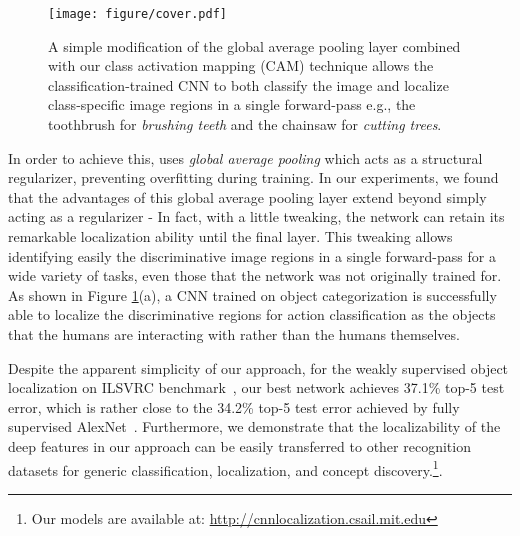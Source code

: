 \documentclass[10pt,twocolumn,letterpaper]{article}
\begin{document}
\begin{figure}
\begin{center}
\texttt{[image: figure/cover.pdf]}
\end{center}
\vspace*{-4mm}
\caption{A simple modification of the global average pooling layer combined with our class activation mapping (CAM) technique allows the classification-trained CNN to both classify the image and localize class-specific image regions in a single forward-pass e.g., the toothbrush for \textit{brushing teeth} and the chainsaw for \textit{cutting trees}.}\label{figure_cover}
\end{figure}

In order to achieve this, \cite{lin2013network} uses \textit{global average pooling} which acts as a structural regularizer, preventing overfitting during training. In our experiments, we found that the advantages of this global average pooling layer extend beyond simply acting as a regularizer - In fact, with a little tweaking, the network can retain its remarkable localization ability until the final layer. This tweaking allows identifying easily the discriminative image regions in a single forward-pass for a wide variety of tasks, even those that the network was not originally trained for. As shown in Figure \ref{figure_cover}(a), a CNN trained on object categorization is successfully able to localize the discriminative regions for action classification as the objects that the humans are interacting with rather than the humans themselves. %


Despite the apparent simplicity of our approach, for the weakly supervised object localization on ILSVRC benchmark~\cite{ILSVRCijcv15}, our best network achieves 37.1\% top-5 test error, which is rather close to the 34.2\% top-5 test error achieved by fully supervised AlexNet~\cite{krizhevsky2012imagenet}. Furthermore, we demonstrate that the localizability of the deep features in our approach can be easily transferred to other recognition datasets for generic classification, localization, and concept discovery.\footnote{Our models are available at: \href{http://cnnlocalization.csail.mit.edu}{http://cnnlocalization.csail.mit.edu}}.
\end{document}
